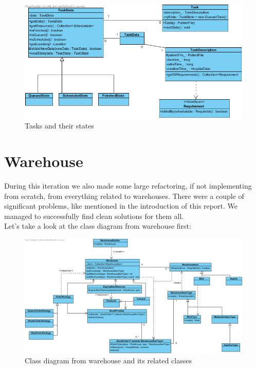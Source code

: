 \documentclass[12pt]{article}
\begin{document}
\begin{figure}
\includegraphics[width=150mm]{TaskState.png}
\caption{Tasks and their states}
\label{taskstate}
\end{figure}

\section{Warehouse}
During this iteration we also made some large refactoring, if not implementing from scratch, from everything related to warehouses. There were a couple of significant problems, like mentioned in the introduction of this report. We managed to successfully find clean solutions for them all.\\
Let's take a look at the class diagram from warehouse first: 

\begin{figure}[h!]
\includegraphics[width=170mm]{Warehouse.png}
\caption{Class diagram from warehouse and its related classes}
\label{warehouse}
\end{figure}
\end{document}
